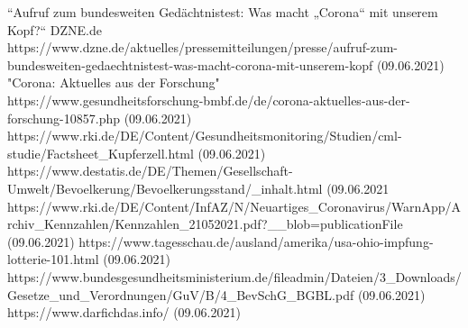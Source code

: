 \documentclass[conference]{IEEEtran}
\begin{document}
\begin{thebibliography}{00}
 “Aufruf zum bundesweiten Gedächtnistest: Was macht „Corona“ mit unserem Kopf?“ DZNE.de \\https://www.dzne.de/aktuelles/pressemitteilungen/presse/aufruf-zum-bundesweiten-gedaechtnistest-was-macht-corona-mit-unserem-kopf (09.06.2021)
 "Corona: Aktuelles aus der Forschung" \\https://www.gesundheitsforschung-bmbf.de/de/corona-aktuelles-aus-der-forschung-10857.php (09.06.2021)
 https://www.rki.de/DE/Content/Gesundheitsmonitoring/Studien/cml-studie/Factsheet\_Kupferzell.html (09.06.2021)
 https://www.destatis.de/DE/Themen/Gesellschaft-Umwelt/Bevoelkerung/Bevoelkerungsstand/\_inhalt.html (09.06.2021
 https://www.rki.de/DE/Content/InfAZ/N/Neuartiges\_Coronavirus/WarnApp/Archiv\_Kennzahlen/Kennzahlen\_21052021.pdf?\_\_blob=publicationFile (09.06.2021)
 https://www.tagesschau.de/ausland/amerika/usa-ohio-impfung-lotterie-101.html (09.06.2021)
 https://www.bundesgesundheitsministerium.de/fileadmin/Dateien/3\_Downloads/Gesetze\_und\_Verordnungen/GuV/B/4\_BevSchG\_BGBL.pdf (09.06.2021)
 https://www.darfichdas.info/ (09.06.2021)

\end{thebibliography}
\vspace{12pt}
\end{document}
